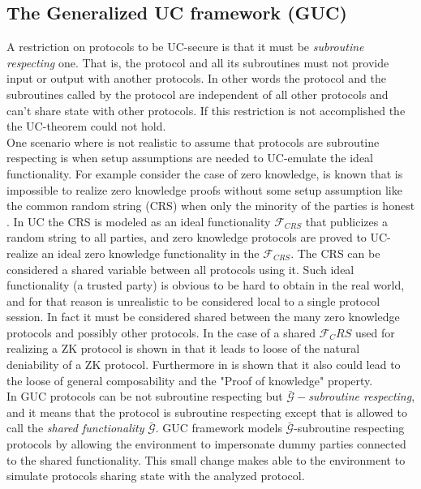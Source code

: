 \documentclass{acm_proc_article-sp}
\begin{document}
\subsection{The Generalized UC framework (GUC)}
A restriction on protocols to be UC-secure is that it must be \textit{subroutine respecting} one. That is, the protocol
and all its subroutines must not provide input or output with another protocols. In other words the protocol
and the subroutines called by the protocol are independent of all other protocols and can't share state with
other protocols. If this restriction is not accomplished the the UC-theorem could not
hold.\\
One scenario where is not realistic to assume that protocols are subroutine respecting is when setup
assumptions are needed to UC-emulate the ideal functionality. For example consider the
case of zero knowledge, is known that is impossible to realize zero knowledge proofs without some setup
assumption like the common random string (CRS) when only the minority of the parties is honest 
\cite{CanKusLin06}.
In UC the CRS is modeled as an ideal functionality
$\mathcal{F}_{CRS}$ that publicizes a random string to all parties, and zero knowledge protocols are proved to
UC-realize an ideal zero knowledge functionality in the $\mathcal{F}_{CRS}$. The CRS can be considered a
shared variable between all protocols using it. Such ideal functionality (a trusted party) is obvious to be hard
to obtain in the real world, and for that
reason is unrealistic to be considered local to a single protocol session. In fact it must be considered
shared between the many zero knowledge protocols and possibly other protocols. In the case of a shared
$\mathcal{F}_CRS$ used for realizing a ZK protocol is shown in \cite{Pass03} that it leads to loose of
the natural deniability of a ZK protocol. Furthermore in \cite{journals/tcs/YaoYZ09} is shown that it
also could lead to the loose of general composability and the "Proof of knowledge" property.\\
In GUC protocols can be not subroutine respecting but $\bar{\mathcal{G}}-$\textit{subroutine respecting},
and it means that the protocol is subroutine respecting except that is allowed to call the \textit{shared
functionality} $\bar{\mathcal{G}}$.
GUC framework models $\bar{\mathcal{G}}$-subroutine respecting  protocols by allowing the environment to
impersonate dummy parties connected to the shared functionality. This
small change makes able to the environment to simulate protocols sharing state with the analyzed protocol.\\
\end{document}
